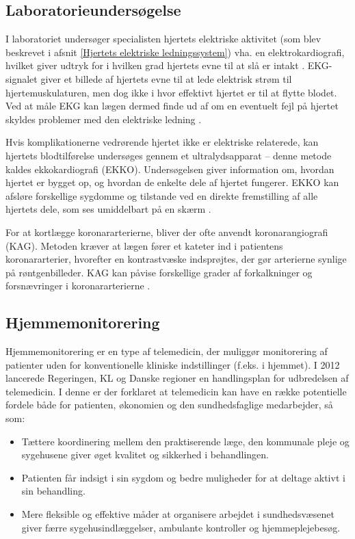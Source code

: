 \subsection{Laboratorieundersøgelse}
I laboratoriet undersøger specialisten hjertets elektriske aktivitet (som blev beskrevet i afsnit \ref{Hjertets elektriske ledningssystem}) vha. en elektrokardiografi, hvilket giver udtryk for i hvilken grad hjertets evne til at slå er intakt \cite{ekg}. EKG-signalet giver et billede af hjertets evne til at lede elektrisk strøm til hjertemuskulaturen, men dog ikke i hvor effektivt hjertet er til at flytte blodet. Ved at måle EKG kan lægen dermed finde ud af om en eventuelt fejl på hjertet skyldes problemer med den elektriske ledning \cite{ekg}.
 
Hvis komplikationerne vedrørende hjertet ikke er elektriske relaterede, kan hjertets blodtilførelse undersøges gennem et ultralydsapparat – denne metode kaldes ekkokardiografi (EKKO). Undersøgelsen giver information om, hvordan hjertet er bygget op, og hvordan de enkelte dele af hjertet fungerer. EKKO kan afsløre forskellige sygdomme og tilstande ved en direkte fremstilling af alle hjertets dele, som ses umiddelbart på en skærm \cite{hjerud}.
 
For at kortlægge koronararterierne, bliver der ofte anvendt koronarangiografi (KAG). Metoden kræver at lægen fører et kateter ind i patientens koronararterier, hvorefter en kontrastvæske indsprøjtes, der gør arterierne synlige på røntgenbilleder. KAG kan påvise forskellige grader af forkalkninger og forsnævringer i koronararterierne \cite{hjerud}. 
 
\subsection{Hjemmemonitorering}
Hjemmemonitorering er en type af telemedicin, der muliggør monitorering af patienter uden for konventionelle kliniske indstillinger (f.eks. i hjemmet). I 2012 lancerede Regeringen, KL og Danske regioner en handlingsplan for udbredelsen af telemedicin. I denne er der forklaret at telemedicin kan have en række potentielle fordele både for patienten, økonomien og den sundhedsfaglige medarbejder, så som:
\begin{itemize}
\item Tættere koordinering mellem den praktiserende læge, den kommunale pleje og sygehusene giver øget kvalitet og sikkerhed i behandlingen.
\item Patienten får indsigt i sin sygdom og bedre muligheder for at deltage aktivt i sin behandling.
\item Mere fleksible og effektive måder at organisere arbejdet i sundhedsvæsenet giver færre sygehusindlæggelser, ambulante kontroller og hjemmeplejebesøg.
\end{itemize}
 
